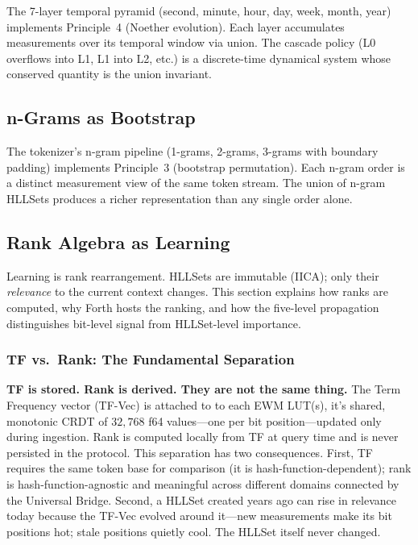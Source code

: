 \documentclass[11pt,a4paper]{article}
\theoremstyle{remark}
\begin{document}
The 7-layer temporal pyramid (second, minute, hour, day, week, month, year) implements
Principle~4 (Noether evolution). Each layer accumulates measurements over its temporal
window via union. The cascade policy (L0 overflows into L1, L1 into L2, etc.) is a
discrete-time dynamical system whose conserved quantity is the union invariant.

\subsection{n-Grams as Bootstrap}

The tokenizer's n-gram pipeline (1-grams, 2-grams, 3-grams with boundary padding)
implements Principle~3 (bootstrap permutation). Each n-gram order is a distinct
measurement view of the same token stream. The union of n-gram HLLSets produces a richer
representation than any single order alone.

\subsection{Rank Algebra as Learning}

Learning is rank rearrangement. HLLSets are immutable (IICA); only their
\textit{relevance} to the current context changes. This section explains how ranks
are computed, why Forth hosts the ranking, and how the five-level propagation
distinguishes bit-level signal from HLLSet-level importance.

\subsubsection{TF vs.\ Rank: The Fundamental Separation}

\textbf{TF is stored. Rank is derived. They are not the same thing.}  The Term
Frequency vector (TF-Vec) is attached to to each EWM LUT(s), it's shared, monotonic CRDT of $32{,}768$ f64 values---one
per bit position---updated only during ingestion.  Rank is computed locally from TF
at query time and is never persisted in the protocol.  This separation has two
consequences.  First, TF requires the same token base for comparison (it is
hash-function-dependent); rank is hash-function-agnostic and meaningful across
different domains connected by the Universal Bridge.  Second, a HLLSet created years
ago can rise in relevance today because the TF-Vec evolved around it---new
measurements make its bit positions hot; stale positions quietly cool.  The HLLSet
itself never changed.
\end{document}
